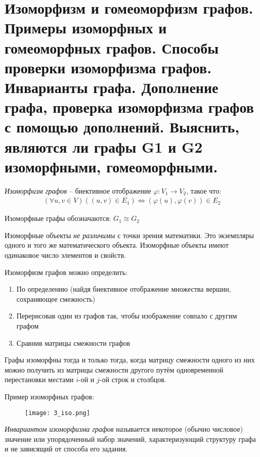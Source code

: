 \section{Изоморфизм и гомеоморфизм графов. Примеры изоморфных и гомеоморфных графов. Способы 
проверки изоморфизма графов. Инварианты графа. Дополнение графа, проверка изоморфизма 
графов с помощью дополнений. Выяснить, являются ли графы G1 и G2 изоморфными, 
гомеоморфными.}

\begin{definition}
    \textit{Изоморфизм графов} -- биективное отображение $\varphi: V_1 \rightarrow V_2$, такое что:
    \begin{align*}
        (\forall u,v \in V)((u,v) \in E_1) \Leftrightarrow (\varphi(u),\varphi(v)) \in E_2
    \end{align*}
\end{definition}

Изоморфные графы обозначаются: $G_1 \cong G_2$

Изоморфные объекты \textit{не различимы} с точки зрения математики. Это экземпляры
одного и того же математического объекта. Изоморфные объекты имеют одинаковое
число элементов и свойств.

Изоморфизм графов можно определить:
\begin{enumerate}[left=0.0em, labelsep=1em, topsep=0.0em, itemsep=0pt, parsep=0.5em]
    \item По определению (найдя биективное отображение множества вершин,
    сохраняющее смежность)
    \item Перерисовав один из графов так, чтобы изображение совпало с другим
    графом
    \item Сравнив матрицы смежности графов
\end{enumerate}

\begin{theorem}
    Графы изоморфны тогда и только тогда, когда матрицу смежности
одного из них можно получить из матрицы смежности другого путём
одновременной перестановки местами $i$-ой и $j$-ой строк и столбцов.
\end{theorem}

Пример изоморфных графов:
\begin{figure}[h]
    \centering
    \texttt{[image: 3\_iso.png]}
\end{figure}

\begin{definition}
    \textit{Инвариантом изоморфизма графов} называется некоторое
    (обычно числовое) значение или упорядоченный набор значений,
    характеризующий структуру графа и не зависящий от способа его задания.
\end{definition}

